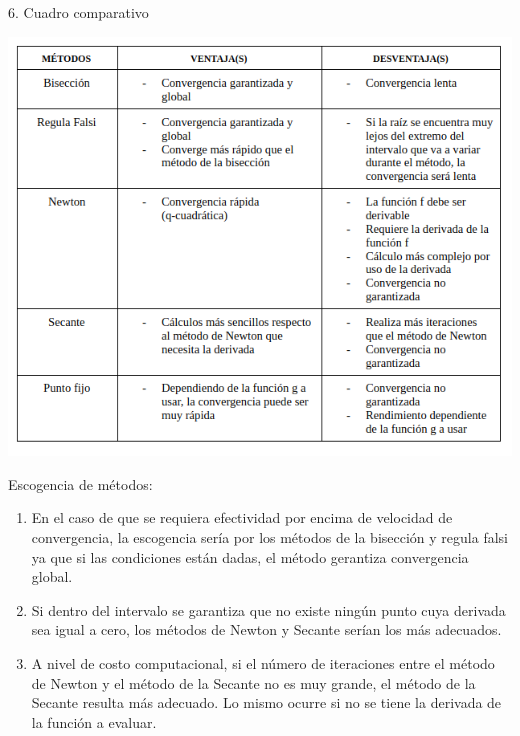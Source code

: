 \documentclass[11pt]{article}
\begin{document}
\begin{center} \Large {6. Cuadro comparativo} \end{center}
\begin{center}
    \includegraphics[keepaspectratio, width=15cm]{Cuadro.png}
    \caption{\\}
\end{center}   

Escogencia de métodos:
\begin{enumerate}
\item[\textendash] En el caso de que se requiera efectividad por encima de velocidad de convergencia, la escogencia sería por los métodos de la bisección y regula falsi ya que si las condiciones están dadas, el método gerantiza convergencia global.
\item[\textendash] Si dentro del intervalo se garantiza que no existe ningún punto cuya derivada sea igual a cero, los métodos de Newton y Secante serían los más adecuados.
\item[\textendash] A nivel de costo computacional, si el número de iteraciones entre el método de Newton y el método de la Secante no es muy grande, el método de la Secante resulta más adecuado. Lo mismo ocurre si no se tiene la derivada de la función a evaluar.
\end{enumerate}
\end{document}
